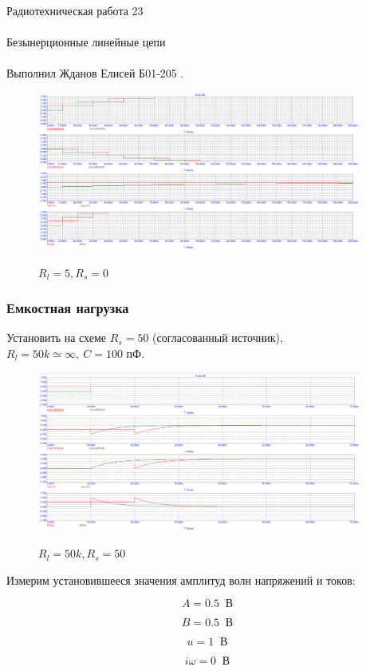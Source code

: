 \documentclass{astroedu-lab}
\begin{document}
\begin{problem}{\huge Радиотехническая работа 23\\\\Безынерционные линейные цепи\\\\Выполнил Жданов Елисей Б01-205}
.

\begin{figure}[h!]
\centering
\includegraphics[width=0.95\textwidth]{картинки/Graph14.png}
\label{fig:Image1}
\caption{$R_l = 5, R_s = 0$}
\end{figure}

\newpage

\subsubsection{Емкостная нагрузка}

Установить на схеме $R_s = 50$ (согласованный источник), $R_l = 50k \simeq \infty, \: C = 100 \textit{ пФ}$.

\begin{figure}[h!]
\centering
\includegraphics[width=0.95\textwidth]{картинки/Graph15.png}
\label{fig:Image1}
\caption{$R_l = 50k, R_s = 50$}
\end{figure}

Измерим установившееся значения амплитуд волн напряжений и токов:

\[A = 0.5 \: \textit{ В}\]

\[B = 0.5 \: \textit{ В}\]

\[u = 1 \: \textit{ В}\]

\[i\omega = 0 \: \textit{ В}\]


\end{problem}
\end{document}
